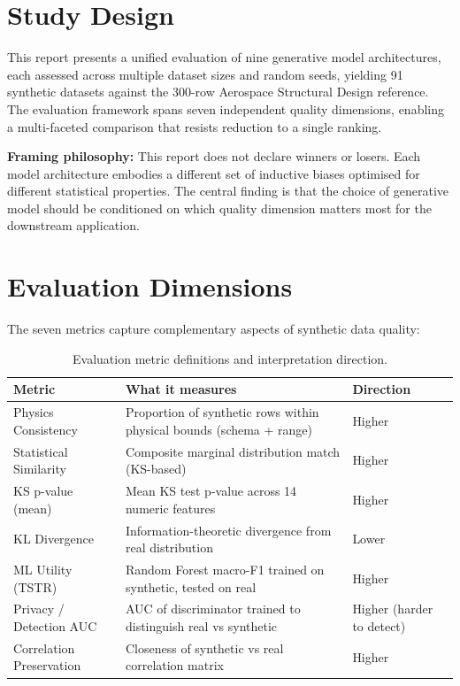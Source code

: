 \documentclass[11pt, a4paper]{report}
\begin{document}
\section{Study Design}

This report presents a unified evaluation of nine generative model architectures, each assessed across multiple dataset sizes and random seeds, yielding 91 synthetic datasets against the 300-row Aerospace Structural Design reference. The evaluation framework spans seven independent quality dimensions, enabling a multi-faceted comparison that resists reduction to a single ranking.

\begin{insightbox}
\textbf{Framing philosophy:} This report does not declare winners or losers. Each model architecture embodies a different set of inductive biases optimised for different statistical properties. The central finding is that the choice of generative model should be conditioned on which quality dimension matters most for the downstream application.
\end{insightbox}

\section{Evaluation Dimensions}

The seven metrics capture complementary aspects of synthetic data quality:

\begin{table}[H]
\centering
\caption{Evaluation metric definitions and interpretation direction.}
\label{tab:metrics}
\begin{tabularx}{\textwidth}{lXl}
\toprule
\textbf{Metric} & \textbf{What it measures} & \textbf{Direction} \\
\midrule
Physics Consistency      & Proportion of synthetic rows within physical bounds (schema + range) & Higher \\
Statistical Similarity   & Composite marginal distribution match (KS-based) & Higher \\
KS p-value (mean)        & Mean KS test p-value across 14 numeric features & Higher \\
KL Divergence            & Information-theoretic divergence from real distribution & Lower \\
ML Utility (TSTR)        & Random Forest macro-F1 trained on synthetic, tested on real & Higher \\
Privacy / Detection AUC  & AUC of discriminator trained to distinguish real vs synthetic & Higher (harder to detect) \\
Correlation Preservation & Closeness of synthetic vs real correlation matrix & Higher \\
\bottomrule
\end{tabularx}
\end{table}
\end{document}
